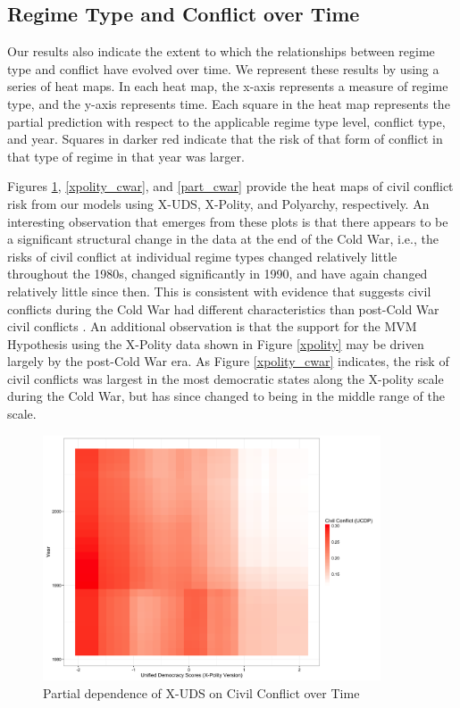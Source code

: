 \documentclass[titlepage, onecolumn,12pt]{article}
\begin{document}
\subsection{Regime Type and Conflict over Time}

Our results also indicate the extent to which the relationships between regime type and conflict have evolved over time.  We represent these results by using a series of heat maps.  In each heat map, the x-axis represents a measure of regime type, and the y-axis represents time.  Each square in the heat map represents the partial prediction with respect to the applicable regime type level, conflict type, and year.  Squares in darker red indicate that the risk of that form of conflict in that type of regime in that year was larger.

Figures \ref{xuds_cwar}, \ref{xpolity_cwar}, and \ref{part_cwar} provide the heat maps of civil conflict risk from our models using X-UDS, X-Polity, and Polyarchy, respectively.  An interesting observation that emerges from these plots is that there appears to be a significant structural change in the data at the end of the Cold War, i.e., the risks of civil conflict at individual regime types changed relatively little throughout the 1980s, changed significantly in 1990, and have again changed relatively little since then.  This is consistent with evidence that suggests civil conflicts during the Cold War had different characteristics than post-Cold War civil conflicts \citep{kalyvas2001new}.  An additional observation is that the support for the MVM Hypothesis using the X-Polity data shown in Figure \ref{xpolity} may be driven largely by the post-Cold War era.  As Figure \ref{xpolity_cwar} indicates, the risk of civil conflicts was largest in the most democratic states along the X-polity scale during the Cold War, but has since changed to being in the middle range of the scale.

\clearpage

\begin{figure}[ht!]
\begin{center}
\includegraphics[width=100mm]{../figures/cwar_uds_xpolity_int_year_tile.png}
\end{center}
\caption{Partial dependence of X-UDS on Civil Conflict over Time}
\label{xuds_cwar}
\end{figure}
\end{document}
